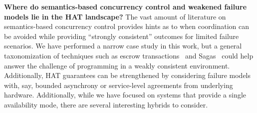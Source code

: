 \textbf{Where do semantics-based concurrency control and weakened
  failure models lie in the HAT landscape?} The vast amount of
literature on semantics-based concurrency control provides hints as to
when coordination can be avoided while providing ``strongly
consistent'' outcomes for limited failure scenarios. We have performed
a narrow case study in this work, but a general taxonomization of
techniques such as escrow transactions~\cite{escrow} and
Sagas~\cite{sagas} could help answer the challenge of programming in a
weakly consistent environment. Additionally, HAT guarantees can be
strengthened by considering failure models with, say, bounded
asynchrony or service-level agreements from underlying
hardware. Additionally, while we have focused on systems that provide
a single availability mode, there are several interesting hybrids to
consider.
